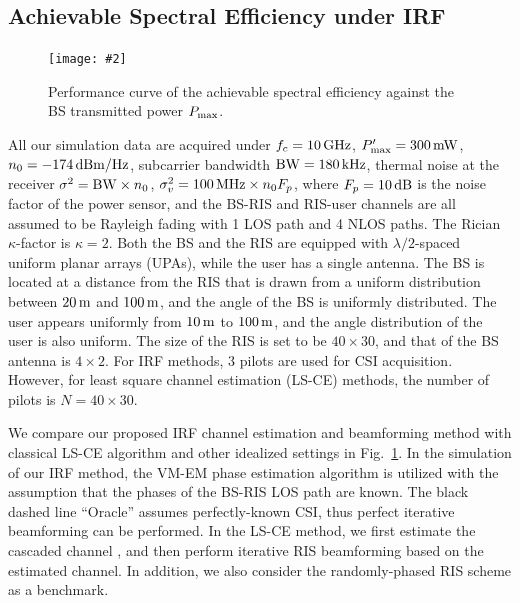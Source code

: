 \documentclass[conference,10pt,twocolumn]{IEEEtran}
\theoremstyle{nonumberplain}
\newcommand{\myincludegraphics}[2][width=8.5cm]{\texttt{[image: \#2]}}
\begin{document}
\subsection{Achievable Spectral Efficiency under IRF} \label{Achievable Spectral Efficiency under IRF}
    \begin{figure}[!t]
        \centering
        \myincludegraphics{data/rate-ML.pdf}
        \caption{Performance curve of the achievable spectral efficiency against the BS transmitted power $P_{\rm max}$.}
        \label{fig:rate}
    \end{figure}
    All our simulation data are acquired under $f_c = 10\,{\rm GHz}$, $P_{\rm max}'=300 \,{\rm mW}$, $n_0=-174\,{\rm dBm/Hz}$, subcarrier bandwidth ${\rm BW} = 180\,{\rm kHz}$, thermal noise at the receiver $\sigma^2 = {\rm BW}\times n_0$, $\sigma_v^2=100\,{\rm MHz}\times n_0 F_p$, where $F_p=10\,{\rm dB}$ is the noise factor of the power sensor, and the BS-RIS and RIS-user channels are all assumed to be Rayleigh fading with 1 \ac{LOS} path and 4 \ac{NLOS} paths. 
    The Rician $\kappa$-factor is $\kappa=2$. 
    Both the BS and the RIS are equipped with $\lambda/2$-spaced uniform planar arrays (UPAs), while the user has a single antenna. 
    The BS is located at a distance from the RIS that is drawn from a uniform distribution between $20\,{\rm m}$ and $100\,{\rm m}$, and the angle of the BS is uniformly distributed. 
    The user appears uniformly from $10\,{\rm m}$ to $100\,{\rm m}$, and the angle distribution of the user is also uniform. 
    The size of the RIS is set to be $40\times 30$, and that of the BS antenna is $4\times 2$. 
    For IRF methods, 3 pilots are used for CSI acquisition. 
    However, for least square channel estimation (LS-CE) methods, the number of pilots is $N=40\times 30$. 

    We compare our proposed \ac{IRF} channel estimation and beamforming method with classical LS-CE algorithm and other idealized settings in Fig.~\ref{fig:rate}. 
    In the simulation of our IRF method, the VM-EM phase estimation algorithm is utilized with the assumption that the phases of the BS-RIS \ac{LOS} path are known. 
    The black dashed line ``Oracle'' assumes perfectly-known CSI, thus perfect iterative beamforming can be performed. 
    In the LS-CE method, we first estimate the cascaded channel \cite{kundu2021channel,wei2021channel}, and then perform iterative RIS beamforming based on the estimated channel. 
    In addition, we also consider the randomly-phased RIS scheme as a benchmark.  
\end{document}
